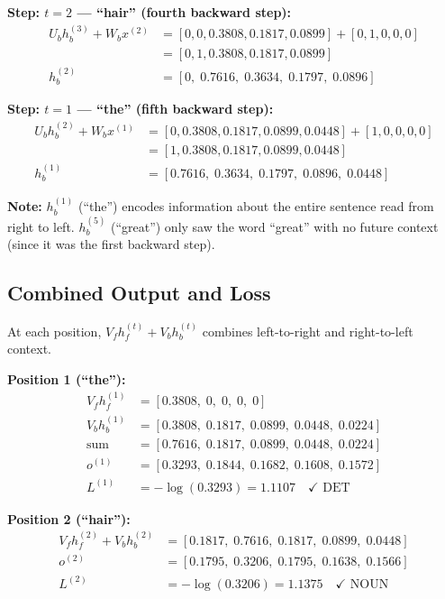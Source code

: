\textbf{Step: $t=2$ --- ``hair'' (fourth backward step):}
\begin{align*}
    U_b h_b^{(3)} + W_b x^{(2)} &= [0,0,0.3808,0.1817,0.0899] + [0,1,0,0,0] \\
    &= [0,1,0.3808,0.1817,0.0899] \\
    h_b^{(2)} &= [0,\; 0.7616,\; 0.3634,\; 0.1797,\; 0.0896]
\end{align*}

\textbf{Step: $t=1$ --- ``the'' (fifth backward step):}
\begin{align*}
    U_b h_b^{(2)} + W_b x^{(1)} &= [0,0.3808,0.1817,0.0899,0.0448] + [1,0,0,0,0] \\
    &= [1,0.3808,0.1817,0.0899,0.0448] \\
    h_b^{(1)} &= [0.7616,\; 0.3634,\; 0.1797,\; 0.0896,\; 0.0448]
\end{align*}

\noindent\textbf{Note:} $h_b^{(1)}$ (``the'') encodes information about the entire sentence
read from right to left. $h_b^{(5)}$ (``great'') only saw the word ``great'' with no
future context (since it was the first backward step).

\subsection{Combined Output and Loss}

At each position, $V_f h_f^{(t)} + V_b h_b^{(t)}$ combines left-to-right and right-to-left context.

\textbf{Position 1 (``the''):}
\begin{align*}
    V_f h_f^{(1)} &= [0.3808,\; 0,\; 0,\; 0,\; 0] \\
    V_b h_b^{(1)} &= [0.3808,\; 0.1817,\; 0.0899,\; 0.0448,\; 0.0224] \\
    \text{sum}    &= [0.7616,\; 0.1817,\; 0.0899,\; 0.0448,\; 0.0224] \\
    o^{(1)}       &= [0.3293,\; 0.1844,\; 0.1682,\; 0.1608,\; 0.1572] \\
    L^{(1)}       &= -\log(0.3293) = 1.1107 \quad \checkmark \text{ DET}
\end{align*}

\textbf{Position 2 (``hair''):}
\begin{align*}
    V_f h_f^{(2)} + V_b h_b^{(2)} &= [0.1817,\; 0.7616,\; 0.1817,\; 0.0899,\; 0.0448] \\
    o^{(2)} &= [0.1795,\; 0.3206,\; 0.1795,\; 0.1638,\; 0.1566] \\
    L^{(2)} &= -\log(0.3206) = 1.1375 \quad \checkmark \text{ NOUN}
\end{align*}

